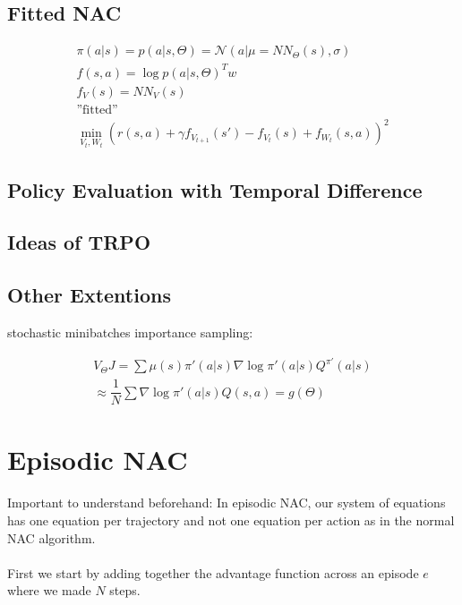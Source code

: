 \subsection{Fitted NAC}

\begin{align}
	\pi(a|s) = p(a|s, \Theta) = \mathcal{N}(a|\mu = NN_{\Theta}(s), \sigma) \\
	f(s,a) = \log p(a|s, \Theta)^T w \\
	f_V(s) = NN_V(s) \\
	\text{''fitted''}\\
	\min_{V_t, W_t} (r(s,a) + \gamma f_{V_{t+1}}(s') - f_{V_t}(s) + f_{W_t}(s,a))^2
\end{align}

\subsection{Policy Evaluation with Temporal Difference}
\cite{dann2014policy}


\subsection{Ideas of TRPO}




\subsection{Other Extentions}

\begin{itemize}
	\x stochastic
	\x minibatches
	\x importance sampling:
\end{itemize}

\begin{align}
	V_{\Theta} J = \sum \mu(s) \pi'(a|s) \nabla \log \pi'(a|s) Q^{\pi'}(a|s) \\
	\approx \dfrac{1}{N} \sum \nabla \log \pi'(a|s) Q(s,a) = g(\Theta)
\end{align}





\section{Episodic NAC}
Important to understand beforehand: In episodic NAC, our system of equations has one equation per trajectory and not one equation per action as in the normal NAC algorithm.
\\\\
First we start by adding together the advantage function across an episode $e$ where we made $N$ steps.

